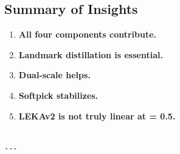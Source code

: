 \subsection{Summary of Insights}

\begin{enumerate}
\item \textbf{All four components contribute.}
\item \textbf{Landmark distillation is essential.}
\item \textbf{Dual-scale helps.}
\item \textbf{Softpick stabilizes.}
\item \textbf{LEKAv2 is not truly linear at   = 0.5.}
\end{enumerate}
\begin{lstlisting}

---
\end{lstlisting}